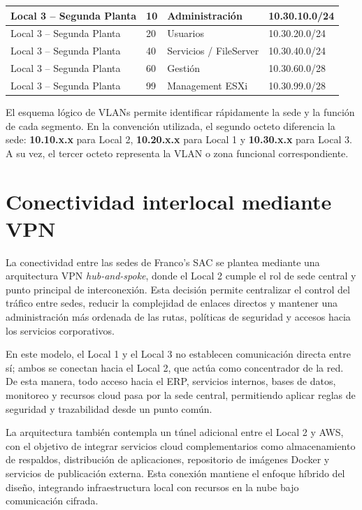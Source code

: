 \documentclass[11pt, a4paper, oneside]{report}
\begin{document}
\begin{xltabular}{\textwidth}{@{}|L{2.5cm}|C{1.5cm}|L{3cm}|X|@{}}
{\small Local 3 -- Segunda Planta} & {\small 10} & {\small Administración} & {\small 10.30.10.0/24} \\ \hline
{\small Local 3 -- Segunda Planta} & {\small 20} & {\small Usuarios} & {\small 10.30.20.0/24} \\ \hline
{\small Local 3 -- Segunda Planta} & {\small 40} & {\small Servicios / FileServer} & {\small 10.30.40.0/24} \\ \hline
{\small Local 3 -- Segunda Planta} & {\small 60} & {\small Gestión} & {\small 10.30.60.0/28} \\ \hline
{\small Local 3 -- Segunda Planta} & {\small 99} & {\small Management ESXi} & {\small 10.30.99.0/28} \\ \hline

\end{xltabular}

\normalsize

El esquema lógico de VLANs permite identificar rápidamente la sede y la función de cada segmento. En la convención utilizada, el segundo octeto diferencia la sede: \textbf{10.10.x.x} para Local 2, \textbf{10.20.x.x} para Local 1 y \textbf{10.30.x.x} para Local 3. A su vez, el tercer octeto representa la VLAN o zona funcional correspondiente.

\section{Conectividad interlocal mediante VPN}

La conectividad entre las sedes de Franco's SAC se plantea mediante una arquitectura VPN \textit{hub-and-spoke}, donde el Local 2 cumple el rol de sede central y punto principal de interconexión. Esta decisión permite centralizar el control del tráfico entre sedes, reducir la complejidad de enlaces directos y mantener una administración más ordenada de las rutas, políticas de seguridad y accesos hacia los servicios corporativos.

En este modelo, el Local 1 y el Local 3 no establecen comunicación directa entre sí; ambos se conectan hacia el Local 2, que actúa como concentrador de la red. De esta manera, todo acceso hacia el ERP, servicios internos, bases de datos, monitoreo y recursos cloud pasa por la sede central, permitiendo aplicar reglas de seguridad y trazabilidad desde un punto común.

La arquitectura también contempla un túnel adicional entre el Local 2 y AWS, con el objetivo de integrar servicios cloud complementarios como almacenamiento de respaldos, distribución de aplicaciones, repositorio de imágenes Docker y servicios de publicación externa. Esta conexión mantiene el enfoque híbrido del diseño, integrando infraestructura local con recursos en la nube bajo comunicación cifrada.
\end{document}
